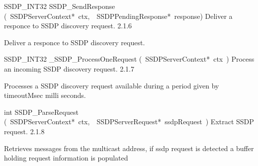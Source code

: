 \documentclass{article}
\begin{document}
\begin{cxxentry}
\begin{cxxentry}
\begin{cxxfunction}
\begin{cxxdoc}
\end{cxxdoc}
\end{cxxfunction}
\begin{cxxfunction}
{SSDP\_INT32}
        {SSDP\_SendResponse}
        {(\ SSDPServerContext*\ ctx,\ \ SSDPPendingResponse*\ response)}
        {Deliver a responce to SSDP discovery request.}
        {2.1.6}
\begin{cxxdoc}
Deliver a responce to SSDP discovery request.


\end{cxxdoc}
\end{cxxfunction}
\begin{cxxfunction}
{SSDP\_INT32}
        {\_SSDP\_ProcessOneRequest}
        {(\ SSDPServerContext*\ ctx\ )}
        {Process an incoming SSDP discovery request. }
        {2.1.7}
\begin{cxxdoc}
Processes a SSDP discovery request available during a period given by
timeoutMsec milli seconds.


\end{cxxdoc}
\end{cxxfunction}
\begin{cxxfunction}
{int}
        {SSDP\_ParseRequest}
        {(\ SSDPServerContext*\ ctx,\ \ SSDPServerRequest*\ ssdpRequest\ )}
        {Extract SSDP request. }
        {2.1.8}
\begin{cxxdoc}
Retrieves messages from the multicast address, if ssdp request is
detected a buffer holding request information is populated



\end{cxxdoc}
\end{cxxfunction}
\end{cxxentry}
\end{cxxentry}
\end{document}
